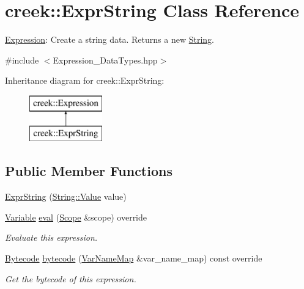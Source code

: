 \hypertarget{classcreek_1_1_expr_string}{}\section{creek\+:\+:Expr\+String Class Reference}
\label{classcreek_1_1_expr_string}


\hyperlink{classcreek_1_1_expression}{Expression}\+: Create a string data. Returns a new {\ttfamily \hyperlink{classcreek_1_1_string}{String}}.  




{\ttfamily \#include $<$Expression\+\_\+\+Data\+Types.\+hpp$>$}

Inheritance diagram for creek\+:\+:Expr\+String\+:\begin{figure}[H]
\begin{center}
\leavevmode
\includegraphics[height=2.000000cm]{classcreek_1_1_expr_string}
\end{center}
\end{figure}
\subsection*{Public Member Functions}
\begin{DoxyCompactItemize}
\item 
\hyperlink{classcreek_1_1_expr_string_a311fa46035d862f5435406ada40bd7ab}{Expr\+String} (\hyperlink{classcreek_1_1_string_a1bdb539e8a99ae376aa43e64004ab9ca}{String\+::\+Value} value)
\item 
\hyperlink{classcreek_1_1_variable}{Variable} \hyperlink{classcreek_1_1_expr_string_a7db398cd35dcfc552a2c17e430cf1d1b}{eval} (\hyperlink{classcreek_1_1_scope}{Scope} \&scope) override
\begin{DoxyCompactList}\small\item\em Evaluate this expression. \end{DoxyCompactList}\item 
\hyperlink{classcreek_1_1_bytecode}{Bytecode} \hyperlink{classcreek_1_1_expr_string_aa71eeae6143e707bae8be26dee35fdbc}{bytecode} (\hyperlink{classcreek_1_1_var_name_map}{Var\+Name\+Map} \&var\+\_\+name\+\_\+map) const  override\hypertarget{classcreek_1_1_expr_string_aa71eeae6143e707bae8be26dee35fdbc}{}\label{classcreek_1_1_expr_string_aa71eeae6143e707bae8be26dee35fdbc}

\begin{DoxyCompactList}\small\item\em Get the bytecode of this expression. \end{DoxyCompactList}\end{DoxyCompactItemize}


